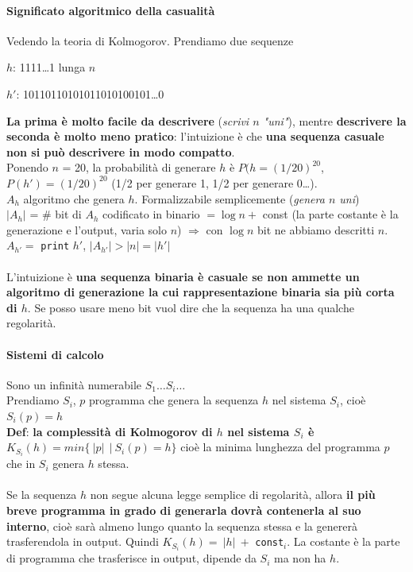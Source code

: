\documentclass[10pt]{book}
\begin{document}
\paragraph{Significato algoritmico della casualità} Vedendo la teoria di Kolmogorov. Prendiamo due sequenze
\begin{list}{}{}
	\item $h$: 1111\ldots 1 lunga $n$
	\item $h'$: 10110110101011010100101\ldots 0
\end{list}
\textbf{La prima è molto facile da descrivere} (\textit{scrivi $n$ "uni"}), mentre \textbf{descrivere la seconda è molto meno pratico}: l'intuizione è che \textbf{una sequenza casuale non si può descrivere in modo compatto}.\\
Ponendo $n$ = 20, la probabilità di generare $h$ è $P(h = (1/20)^{20}$, $P(h') = (1/20)^{20}$ (1/2 per generare 1, 1/2 per generare 0\ldots).\\
$A_h$ algoritmo che genera $h$. Formalizzabile semplicemente (\textit{genera $n$ uni})\\
$|A_h|$ = $\#$ bit di $A_h$ codificato in binario $= \log n +$ const (la parte costante è la generazione e l'output, varia solo $n$) $\Rightarrow$ con $\log n$ bit ne abbiamo descritti $n$.\\
$A_{h'} =$ \texttt{print} $h'$, $|A_{h'}| > |n| = |h'|$\\\\
L'intuizione è \textbf{una sequenza binaria è casuale se non ammette un algoritmo di generazione la cui rappresentazione binaria sia più corta di $h$}. Se posso usare meno bit vuol dire che la sequenza ha una qualche regolarità.
\paragraph{Sistemi di calcolo} Sono un infinità numerabile $S_1\ldots S_i\ldots$\\
Prendiamo $S_i$, $p$ programma che genera la sequenza $h$ nel sistema $S_i$, cioè $S_i(p) = h$\\
\textbf{Def}: \textbf{la complessità di Kolmogorov di $h$ nel sistema $S_i$ è $K_{S_i}(h) = min\{\:|p|\: \:|\: S_i(p) = h\}$} cioè la minima lunghezza del programma $p$ che in $S_i$ genera $h$ stessa.\\\\
Se la sequenza $h$ non segue alcuna legge semplice di regolarità, allora \textbf{il più breve programma in grado di generarla dovrà contenerla al suo interno}, cioè sarà almeno lungo quanto la sequenza stessa e la genererà trasferendola in output. Quindi $K_{S_i}(h) = \:|h|\: +$ \texttt{const}$_i$. La costante è la parte di programma che trasferisce in output, dipende da $S_i$ ma non ha $h$.
\end{document}
